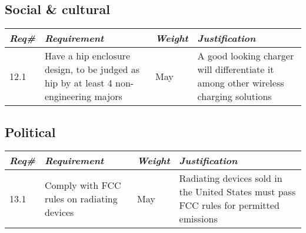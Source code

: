         
    \subsection{Social \& cultural}
        \begin{centering}
        \begin{tabular}{|l|m{7cm}|l|m{7cm}|} \hline
        \textit{\textbf{Req\#}}	& \textit{\textbf{Requirement}} &\textit{\textbf{Weight}}&\textit{\textbf{Justification}} \\ \hline
        12.1 & Have a hip enclosure design, to be judged as hip by at least 4 non-engineering majors & May & A good looking charger will differentiate it among other wireless charging solutions \\ \hline
        \end{tabular}
        \end{centering}
             
    \subsection{Political}
        \begin{centering}
        \begin{tabular}{|l|m{7cm}|l|m{7cm}|} \hline
        \textit{\textbf{Req\#}}	& \textit{\textbf{Requirement}} &\textit{\textbf{Weight}}&\textit{\textbf{Justification}} \\ \hline
        13.1 & Comply with FCC rules on radiating devices & May & Radiating devices sold in the United States must pass FCC rules for permitted emissions \\ \hline
        \end{tabular}
        \end{centering}
             
